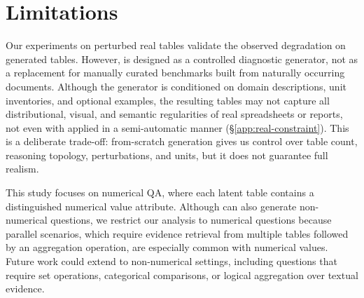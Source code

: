 \section{Limitations}
\label{sec:limitations}
\vspace{-1ex}
Our experiments on perturbed real tables validate the observed degradation on generated tables. However, \name is designed as a controlled diagnostic generator, not as a replacement for manually curated benchmarks built from naturally occurring documents.
Although the generator is conditioned on domain descriptions, unit inventories, and optional examples, the resulting tables may not capture all distributional, visual, and semantic regularities of real spreadsheets or reports, not even with \name applied in a semi-automatic manner (\S\ref{app:real-constraint}).
This is a deliberate trade-off: from-scratch generation gives us control over table count, reasoning topology, perturbations, and units, but it does not guarantee full realism. 

 This study focuses on numerical QA, where each latent table contains a distinguished numerical value attribute. Although \name{} can also generate non-numerical questions, we restrict our analysis to numerical questions because parallel scenarios, which require evidence retrieval from multiple tables followed by an aggregation operation, are especially common with numerical values. Future work could extend \name{} to non-numerical settings, including questions that require set operations, categorical comparisons, or logical aggregation over textual evidence.


